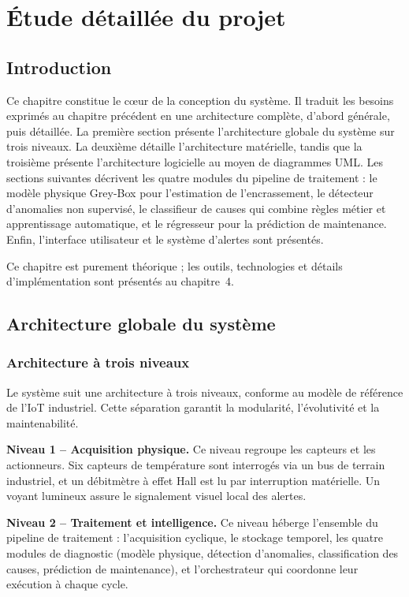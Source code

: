 \chapter{Étude détaillée du projet}

\section*{Introduction}

Ce chapitre constitue le cœur de la conception du système. Il traduit les besoins exprimés au chapitre précédent en une architecture complète, d'abord générale, puis détaillée. La première section présente l'architecture globale du système sur trois niveaux. La deuxième détaille l'architecture matérielle, tandis que la troisième présente l'architecture logicielle au moyen de diagrammes UML. Les sections suivantes décrivent les quatre modules du pipeline de traitement : le modèle physique Grey-Box pour l'estimation de l'encrassement, le détecteur d'anomalies non supervisé, le classifieur de causes qui combine règles métier et apprentissage automatique, et le régresseur pour la prédiction de maintenance. Enfin, l'interface utilisateur et le système d'alertes sont présentés.

Ce chapitre est purement théorique ; les outils, technologies et détails d'implémentation sont présentés au chapitre~4.

\section{Architecture globale du système}

\subsection{Architecture à trois niveaux}

Le système suit une architecture à trois niveaux, conforme au modèle de référence de l'IoT industriel. Cette séparation garantit la modularité, l'évolutivité et la maintenabilité.

\textbf{Niveau 1 -- Acquisition physique.} Ce niveau regroupe les capteurs et les actionneurs. Six capteurs de température sont interrogés via un bus de terrain industriel, et un débitmètre à effet Hall est lu par interruption matérielle. Un voyant lumineux assure le signalement visuel local des alertes.

\textbf{Niveau 2 -- Traitement et intelligence.} Ce niveau héberge l'ensemble du pipeline de traitement : l'acquisition cyclique, le stockage temporel, les quatre modules de diagnostic (modèle physique, détection d'anomalies, classification des causes, prédiction de maintenance), et l'orchestrateur qui coordonne leur exécution à chaque cycle.

